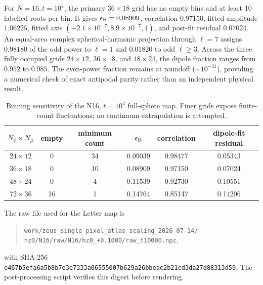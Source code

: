 \documentclass[aps,prl,onecolumn,10pt,notitlepage,superscriptaddress,nofootinbib]{revtex4-2}
\begin{document}
For $N=16,t=10^4$, the primary $36\times18$ grid has no empty bins and at least 10 labelled roots per bin.  It gives $\epsilon_{\rm B}=0.08909$, correlation $0.97150$, fitted amplitude $1.06225$, fitted axis $(-2.1\times10^{-7},8.9\times10^{-7},1)$, and post-fit residual $0.07024$.  An equal-area complex spherical-harmonic projection through $\ell=7$ assigns $0.98180$ of the odd power to $\ell=1$ and $0.01820$ to odd $\ell\geq3$.  Across the three fully occupied grids $24\times12$, $36\times18$, and $48\times24$, the dipole fraction ranges from $0.952$ to $0.985$.  The even-power fraction remains at roundoff ($\sim10^{-31}$), providing a numerical check of exact antipodal parity rather than an independent physical result.

\begin{table}[t]
\caption{Binning sensitivity of the N16, $t=10^4$ full-sphere map.  Finer grids expose finite-count fluctuations; no continuum extrapolation is attempted.}
\label{stab:bins}
\begin{ruledtabular}
\begin{tabular}{cccccc}
$N_\phi\times N_\mu$ & empty & minimum count & $\epsilon_{\rm B}$ & correlation & dipole-fit residual\\
\hline
$24\times12$ & 0  & 34 & 0.09039 & 0.98477 & 0.05343\\
$36\times18$ & 0  & 10 & 0.08909 & 0.97150 & 0.07024\\
$48\times24$ & 0  & 4  & 0.11539 & 0.92730 & 0.10551\\
$72\times36$ & 16 & 1  & 0.14764 & 0.85147 & 0.14206\\
\end{tabular}
\end{ruledtabular}
\end{table}

The raw file used for the Letter map is
\begin{quote}\small
\texttt{work/zeus\_single\_pixel\_atlas\_scaling\_2026-07-14/}\newline
\texttt{hz0/N16/raw/N16/hz0\_+0.1000/raw\_t10000.npz},
\end{quote}
with SHA-256\newline
\texttt{e467b5efa6a5b8b7e3e7333a06555007b629a26bbeac2b21cd3da27d88313d59}.  The post-processing script verifies this digest before rendering.
\end{document}
